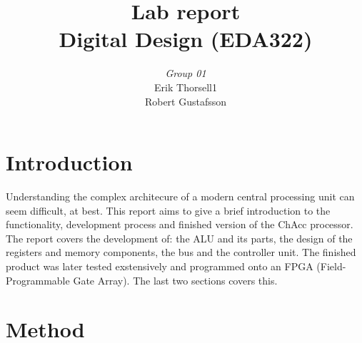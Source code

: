 \documentclass[a4paper,11pt]{article}
\begin{document}
\begin{titlepage}

\title{\Huge{Lab report} \\[0.1cm] \Large{Digital Design (EDA322)}}
\author{\large{\emph{Group 01}} \\[0.2cm] Erik Thorsell1 \\[0.05cm] Robert Gustafsson \\[0.1cm]}
\maketitle
\thispagestyle{empty}
\end{titlepage}
\clearpage
\pagestyle{fancyplain}
\tableofcontents
\clearpage
{}
\setcounter{page}{1}

\section{Introduction}
Understanding the complex architecure of a modern central processing unit can 
seem difficult, at best. This report aims to give a brief introduction to 
the functionality, development process and finished version of the ChAcc 
processor. The report covers the development of: the ALU and its parts, 
the design of the registers and memory components, the bus and the controller 
unit. The finished product was later tested exstensively and programmed onto an 
FPGA (Field-Programmable Gate Array). The last two sections covers this.

\section{Method}
\end{document}
